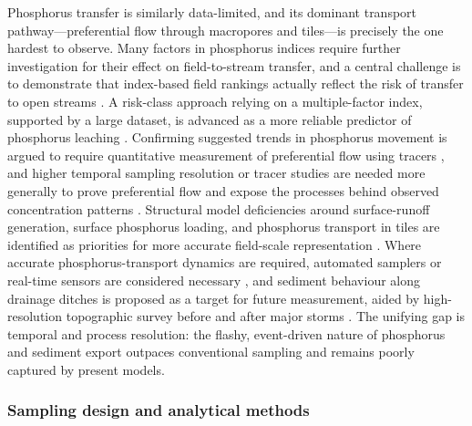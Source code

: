 \documentclass[11pt]{article}
\begin{document}
Phosphorus transfer is similarly data-limited, and its dominant transport pathway---preferential flow through macropores and tiles---is precisely the one hardest to observe. Many factors in phosphorus indices require further investigation for their effect on field-to-stream transfer, and a central challenge is to demonstrate that index-based field rankings actually reflect the risk of transfer to open streams \parencite{Bechmann2007}. A risk-class approach relying on a multiple-factor index, supported by a large dataset, is advanced as a more reliable predictor of phosphorus leaching \parencite{Beauchemin2003}. Confirming suggested trends in phosphorus movement is argued to require quantitative measurement of preferential flow using tracers \parencite{Salazar2011}, and higher temporal sampling resolution or tracer studies are needed more generally to prove preferential flow and expose the processes behind observed concentration patterns \parencite{Tiemeyer2009}. Structural model deficiencies around surface-runoff generation, surface phosphorus loading, and phosphorus transport in tiles are identified as priorities for more accurate field-scale representation \parencite{Apostel2021}. Where accurate phosphorus-transport dynamics are required, automated samplers or real-time sensors are considered necessary \parencite{Dialameh2022}, and sediment behaviour along drainage ditches is proposed as a target for future measurement, aided by high-resolution topographic survey before and after major storms \parencite{Warsta2014}. The unifying gap is temporal and process resolution: the flashy, event-driven nature of phosphorus and sediment export outpaces conventional sampling and remains poorly captured by present models.

\subsubsection{Sampling design and analytical methods}
\end{document}
